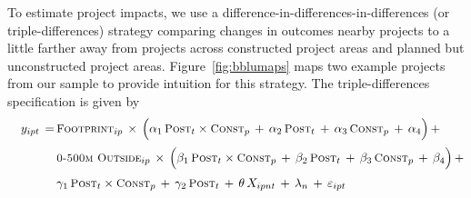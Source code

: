 \documentclass[12pt]{article}
\begin{document}
To estimate project impacts, we use a difference-in-differences-in-differences (or triple-differences) strategy comparing changes in outcomes nearby projects to a little farther away from projects across constructed project areas and planned but unconstructed project areas.  Figure~\ref{fig:bblumaps} maps two example projects from our sample to provide intuition for this strategy.  The triple-differences specification is given by
\begin{align}\label{eq:main}
\begin{split}
\quad y_{ipt} \, =& \,   \textsc{\small Footprint}_{ip} \, \times \, \Big( \alpha_1 \, \textsc{\small Post}_{t}\times\textsc{\small Const}_{p} \, + \, \alpha_2 \, \textsc{\small Post}_{t} \, + \, \alpha_3 \, \textsc{\small Const}_{p}\, +\, \alpha_4 \Big) \, + \\[.2em]
& \, \textsc{\small 0-500m Outside}_{ip} \, \times \, \Big( \beta_1 \, \textsc{\small Post}_{t}\times\textsc{\small Const}_{p} \, + \, \beta_2 \, \textsc{\small Post}_{t} \, + \, \beta_3 \, \textsc{\small Const}_{p} \, +\, \beta_4 \Big) \, + \\[.2em]
& \, \gamma_1 \,  \textsc{\small Post}_{t}\times\textsc{\small Const}_{p} \, + \, \gamma_2 \,\textsc{\small Post}_{t} \, +  \, \theta \, X_{ipnt} \, + \, \lambda_{n} \, +  \, \varepsilon_{ipt} \quad 
\end{split}
\end{align} 
\end{document}
